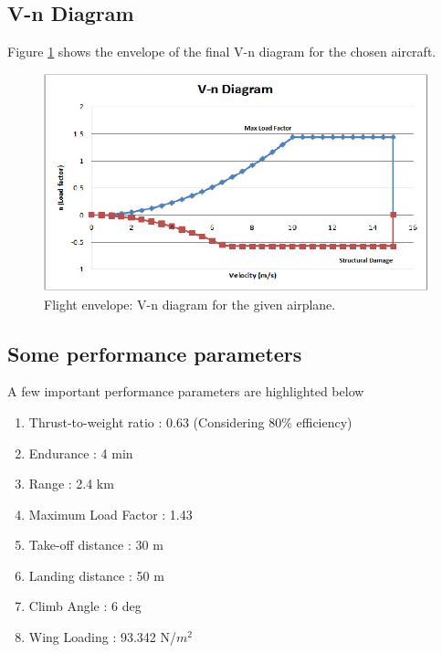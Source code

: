 \subsection{V-n Diagram}
Figure \ref{fig:V_n_diag} shows the envelope of the final V-n diagram for the chosen aircraft.
%
\begin{figure}[H]
    \begin{center}
      \includegraphics[width=6in]{figures/Vn_Dia.jpg}
\caption{Flight envelope: V-n diagram for the given airplane.}
       \label{fig:V_n_diag}
    \end{center}
\end{figure}
%
\subsection{Some performance parameters}
A few important performance parameters are highlighted below
\begin{enumerate}
\item Thrust-to-weight ratio : 0.63 (Considering 80\% efficiency)
\item Endurance : 4 min
\item Range : 2.4 km
\item Maximum Load Factor : 1.43
\item Take-off distance : 30 m
\item Landing distance : 50 m
\item Climb Angle : 6 deg
\item Wing Loading : 93.342 N/$m^2$
\end{enumerate}
%
